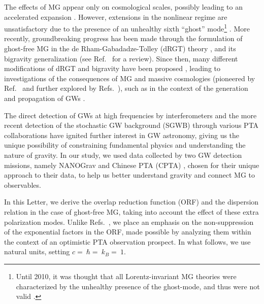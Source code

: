\documentclass[prd,twocolumn,aps,psfig,nofootinbib,nobibnotes,superscriptaddress,preprintnumbers,times]{revtex4-2}
\begin{document}
The effects of MG appear only on cosmological scales, possibly leading to an accelerated expansion \cite{DAmico:2011eto}.
However, extensions in the nonlinear regime are unsatisfactory due to the presence of an unhealthy sixth ``ghost'' mode\footnote{Until 2010, it was thought that all Lorentz-invariant MG theories were characterized by the unhealthy presence of the ghost-mode, and thus were not valid \cite{deRham:2010kj}.} \cite{Boulware:1972yco}.
More recently, groundbreaking progress has been made through the formulation of ghost-free MG in the de Rham-Gabadadze-Tolley (dRGT) theory \cite{deRham:2010ik,deRham:2010kj}, and its bigravity generalization \cite{Hassan:2011zd} (see Ref.~\cite{deRham:2023ngf} for a review). Since then, many different modifications of dRGT and bigravity have been proposed \cite{Hinterbichler:2011tt,deRham:2014zqa,Koyama:2015vza,deRham:2016nuf,Hinterbichler:2016try, Cusin:2016ytz, Kenna-Allison:2019tbu, Kazempour:2022giy},  
leading to investigations of the consequences of MG and massive cosmologies (pioneered by Ref.~\cite{DAmico:2011eto} and further explored by Refs.~\cite{Gratia:2012wt,Gumrukcuoglu:2012aa,Maeda:2013bha,Akrami:2013pna,Zhang:2013noa,Lambiase:2012fv,Koyama:2011wx,Tasinato:2012ze, Solomon:2014iwa, Akrami:2013ffa,Koennig:2014ods,Gumrukcuoglu:2016hic, Heisenberg:2024uwq, Smirnov:2025yru, Comelli:2013tja}),
such as in the context of the generation and propagation of GWs \cite{DeFelice:2013awa,Gumrukcuoglu:2013nza,DeFelice:2013bxa,DeFelice:2015moy,Babichev:2015xha,Sakstein:2017bws}. 

The direct detection of GWs at high frequencies by interferometers \cite{LIGOScientific:2016aoc,LIGOScientific:2016sjg, KAGRA:2020agh, VIRGO:2014yos} and the more recent detection of the stochastic GW background (SGWB) through various PTA collaborations \cite{Agazie:2023, Xu:2023wog,EPTA:2023sfo,EPTA:2023akd,EPTA:2023fyk, Zic:2023gta,Reardon:2023gzh} have ignited further interest in GW astronomy, giving us the unique possibility of constraining fundamental physics and understanding the nature of gravity. 
In our study, we used data collected by two GW detection missions, namely NANOGrav \cite{Agazie:2023} and Chinese PTA (CPTA) \cite{Xu:2023wog}, chosen for their unique approach to their data, to help us better understand gravity and connect MG to observables. 


In this Letter, we derive the overlap reduction function (ORF) and the dispersion relation in the case of ghost-free MG, taking into account the effect of these extra polarization modes. 
Unlike Refs.~\cite{Liang:2021bct, Anholm:2008wy, Arjona:2024cex, Lee:2013awh}, we place an emphasis on the non-suppression of the exponential factors in the ORF, made possible by analyzing them within the context of an optimistic PTA observation prospect. In what follows, we use natural units, setting $c = $$\ \hbar = $$\ k_B = $$\ 1$.
\end{document}
